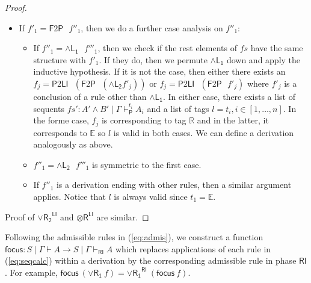\documentclass[submission,copyright,creativecommons]{eptcs}
\theoremstyle{definition}
\newcommand{\tr}{\otimes \mathsf{R}}
\newcommand{\andlone}{\land \mathsf{L_{1}}}
\newcommand{\andltwo}{\land \mathsf{L_{2}}}
\newcommand{\andli}{\land \mathsf{L}_{i}}
\newcommand{\andr}{\land \mathsf{R}}
\newcommand{\orrone}{\lor \mathsf{R_{1}}}
\newcommand{\orrtwo}{\lor \mathsf{R_{2}}}
\newcommand{\RI}{\mathsf{RI}}
\newcommand{\LI}{\mathsf{LI}}
\newcommand{\Pass}{\mathsf{P}}
\newcommand{\F}{\mathsf{F}}
\newcommand{\sw}{\mathsf{sw}}
\newcommand{\tR}{\mathbb{R}}
\newcommand{\tE}{\mathbb{E}}
\newcommand{\proofbox}[1]{\begin{tabular}{l} #1 \end{tabular}}
\begin{document}
\begin{proof}
\begin{itemize}
\begin{itemize}
\begin{itemize}
        The corresponding tag to $f'_j$ is $\tE$ because it is impossible to be a conclusion of any of $\andli$, so the validity of $l$ is justified.
        With $fs'$ and $l$ in hand, we define: 
        \begin{displaymath}
          \begin{array}{cc}
            \infer[\orrone^{\LI}]{- \mid A' , \Gamma \vdash_{\LI} A \lor B}{
              \deduce{- \mid A' , \Gamma \vdash_{\LI} A_i , i \in [1 , \dots , n]}{fs}
            }
            \\[10pt]
            &
            =
            \quad
            \proofbox{
            \infer[\sw]{- \mid A' , \Gamma \vdash_{\LI} A \lor B}{
              \infer[\orrone]{- \mid A' , \Gamma \vdash_{\F} A \lor B}{
                \infer[\andr^{*}_t]{- \mid A' , \Gamma \vdash^{l}_{\RI} A}{
                  \deduce{- \mid A' , \Gamma \vdash^{t_i}_{\Pass} A_i , i \in [1 , \dots , n]}{fs'}
                }
              }
            }
          }
          \end{array}
        \end{displaymath}
      \end{itemize}
      \item If $f'_1 = \F 2 \Pass \text{ } f''_1$, then we do a further case analysis on $f''_1$:
      \begin{itemize}
        \item If $f''_1 = \andlone \text{ } f'''_1$, then we check if the rest elements of $fs$ have the same structure with $f'_1$. If they do, then we permute $\andlone$ down and apply the inductive hypothesis.
        If it is not the case, then either there exists an $f_j = \Pass 2 \LI \text{ } (\F 2 \Pass \text{ } (\andltwo f'_j))$ or $f_j = \Pass 2 \LI \text{ } (\F 2 \Pass \text{ } f'_j)$ where $f'_j$ is a conclusion of a rule other than $\andlone$.
        In either case, there exists a list of sequents $fs' : A' \land B' \mid \Gamma \vdash^{t_i}_{\Pass} A_i$ and a list of tags $l = t_i , i \in [1 , \dots , n]$.
        In the forme case, $f_j$ is corresponding to tag $\tR$ and in the latter, it corresponds to $\tE$ so $l$ is valid in both cases.
        We can define a derivation analogously as above.
        \item $f''_1 = \andltwo \text{ } f'''_1$ is symmetric to the first case.
        \item If $f''_1$ is a derivation ending with other rules, then a similar argument applies.
        Notice that $l$ is always valid since $t_1 = \tE$.
      \end{itemize}
    \end{itemize} 
  \end{itemize}
  Proof of $\orrtwo^{\LI}$ and $\tr^{\LI}$ are similar.
\end{proof}
Following the admissible rules in (\ref{eq:admis}), we construct a function $\mathsf{focus} : S \mid \Gamma \vdash A \to S \mid \Gamma \vdash_{\RI} A$ which replaces applications of each rule in (\ref{eq:seqcalc}) within a derivation by the corresponding admissible rule in phase $\RI$.
For example, $\mathsf{focus} \ (\orrone \ f) = \orrone^{\RI} \ (\mathsf{focus} \ f)$.
\end{document}
